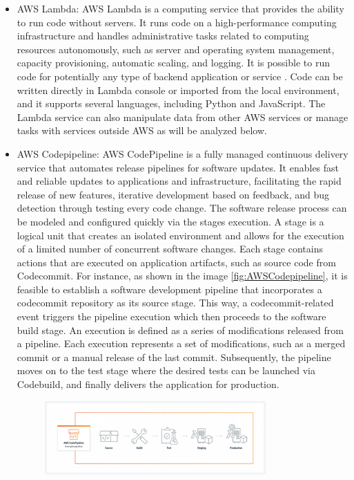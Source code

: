 \begin{itemize}
    \item AWS Lambda: AWS Lambda is a computing service that provides the ability to run code without servers. It runs code on a high-performance computing infrastructure and handles administrative tasks related to computing resources autonomously, such as server and operating system management, capacity provisioning, automatic scaling, and logging. It is possible to run code for potentially any type of backend application or service \cite{AWSLambda}. Code can be written directly in Lambda console or imported from the local environment, and it supports several languages, including Python and JavaScript. The Lambda service can also manipulate data from other AWS services or manage tasks with services outside AWS as will be analyzed below.
    \item AWS Codepipeline: AWS CodePipeline is a fully managed continuous delivery service that automates release pipelines for software updates. It enables fast and reliable updates to applications and infrastructure, facilitating the rapid release of new features, iterative development based on feedback, and bug detection through testing every code change. The software release process can be modeled and configured quickly via the stages execution. A stage is a logical unit that creates an isolated environment and allows for the execution of a limited number of concurrent software changes. Each stage contains actions that are executed on application artifacts, such as source code from Codecommit. For instance, as shown in the image \ref{fig:AWSCodepipeline}, it is feasible to establish a software development pipeline that incorporates a codecommit repository as its source stage. This way, a codecommit-related event triggers the pipeline execution which then proceeds to the software build stage. An execution is defined as a series of modifications released from a pipeline.   Each execution represents a set of modifications, such as a merged commit or a manual release of the last commit. Subsequently, the pipeline moves on to the test stage where the desired tests can be launched via Codebuild, and finally delivers the application for production. 
    \begin{figure}[h]  %
        \centering
        \includegraphics[width=0.8\textwidth]{images/AWSCodepipeline.png}  %

\end{figure}
\end{itemize}
